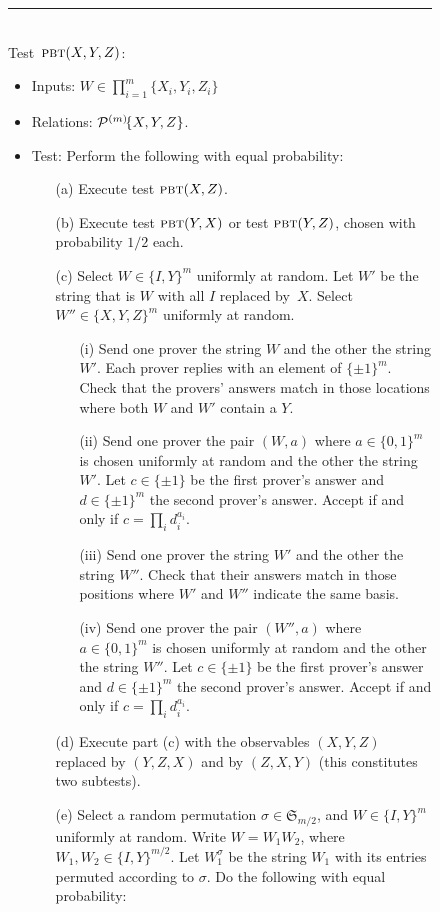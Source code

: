 \begin{figure}[H]
\rule[1ex]{\textwidth}{0.5pt}\\
\justifying
Test~$\textsc{pbt}(X,Y,Z)$: 
\begin{itemize}
\item Inputs: $W\in\prod_{i=1}^m\{X_i,Y_i,Z_i\}$
\item Relations: $\mathcal{P}^{(m)}\!\{X,Y,Z\}$.  
\item Test: Perform the following with equal probability: 
\begin{enumerate}
\item[(a)] Execute test $\textsc{pbt}(X,Z)$. 
\item[(b)] Execute test $\textsc{pbt}(Y,X)$ or test $\textsc{pbt}(Y,Z)$, chosen with probability $1/2$ each.
\item[(c)] Select $W\in\{I,Y\}^m$ uniformly at random. Let $W'$ be the string that is $W$ with all $I$ replaced by~$X$. Select $W'' \in\{X,Y,Z\}^m$ uniformly at random. 
\begin{enumerate}
\item[(i)] Send one prover the string $W$ and the other the string $W'$. Each prover replies with an element of $\{\pm 1\}^m$. Check that the provers' answers match in those locations where both $W$ and $W'$ contain a $Y$. 
\item[(ii)] Send one prover the pair $(W,a)$ where $a\in\{0,1\}^m$ is chosen uniformly at random and the other the string $W'$. Let $c\in\{\pm 1\}$ be the first prover's answer and $d\in \{\pm 1\}^m$ the second prover's answer. Accept if and only if $c= \prod_{i} d_i^{a_i}$.  
\item[(iii)] Send one prover the string $W'$ and the other the string $W''$. Check that their answers match in those positions where $W'$ and $W''$ indicate the same basis. 
\item[(iv)] Send one prover the pair $(W'',a)$ where $a\in\{0,1\}^m$ is chosen uniformly at random and the other the string $W''$. Let $c\in\{\pm 1\}$ be the first prover's answer and $d\in \{\pm 1\}^m$ the second prover's answer. Accept if and only if $c= \prod_{i} d_i^{a_i}$.  \end{enumerate}
\item[(d)] Execute part (c) with the observables $(X,Y,Z)$ replaced by $(Y,Z,X)$ and by $(Z,X,Y)$ (this constitutes two subtests). 
\item[(e)] Select a random permutation  $\sigma \in \mathfrak{S}_{m/2}$, and $W\in  \{I,Y\}^m$ uniformly at random. Write $W=W_1 W_2$, where $W_1,W_2\in \{I,Y\}^{m/2}$. Let $W_1^\sigma$ be the string $W_1$ with its entries permuted according to $\sigma$. Do the following with equal probability: 

\end{enumerate}
\end{itemize}
\end{figure}
